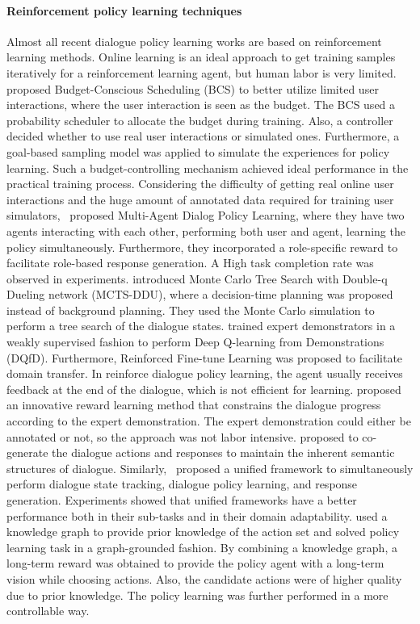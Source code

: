 \paragraph*{Reinforcement policy learning techniques} Almost all recent dialogue policy learning works are based on reinforcement learning methods. Online learning is an ideal approach to get training samples iteratively for a reinforcement learning agent, but human labor is very limited.  proposed Budget-Conscious Scheduling (BCS) to better utilize limited user interactions, where the user interaction is seen as the budget. The BCS used a probability scheduler to allocate the budget during training. Also, a controller decided whether to use real user interactions or simulated ones. Furthermore, a goal-based sampling model was applied to simulate the experiences for policy learning. Such a budget-controlling mechanism achieved ideal performance in the practical training process. Considering the difficulty of getting real online user interactions and the huge amount of annotated data required for training user simulators,~ proposed Multi-Agent Dialog Policy Learning, where they have two agents interacting with each other, performing both user and agent, learning the policy simultaneously. Furthermore, they incorporated a role-specific reward to facilitate role-based response generation. A High task completion rate was observed in experiments.  introduced Monte Carlo Tree Search with Double-q Dueling network (MCTS-DDU), where a decision-time planning was proposed instead of background planning. They used the Monte Carlo simulation to perform a tree search of the dialogue states.  trained expert demonstrators in a weakly supervised fashion to perform Deep Q-learning from Demonstrations (DQfD). Furthermore, Reinforced Fine-tune Learning was proposed to facilitate domain transfer. In reinforce dialogue policy learning, the agent usually receives feedback at the end of the dialogue, which is not efficient for learning.  proposed an innovative reward learning method that constrains the dialogue progress according to the expert demonstration. The expert demonstration could either be annotated or not, so the approach was not labor intensive.  proposed to co-generate the dialogue actions and responses to maintain the inherent semantic structures of dialogue. Similarly,~ proposed a unified framework to simultaneously perform dialogue state tracking, dialogue policy learning, and response generation. Experiments showed that unified frameworks have a better performance both in their sub-tasks and in their domain adaptability.  used a knowledge graph to provide prior knowledge of the action set and solved policy learning task in a graph-grounded fashion. By combining a knowledge graph, a long-term reward was obtained to provide the policy agent with a long-term vision while choosing actions. Also, the candidate actions were of higher quality due to prior knowledge. The policy learning was further performed in a more controllable way.

